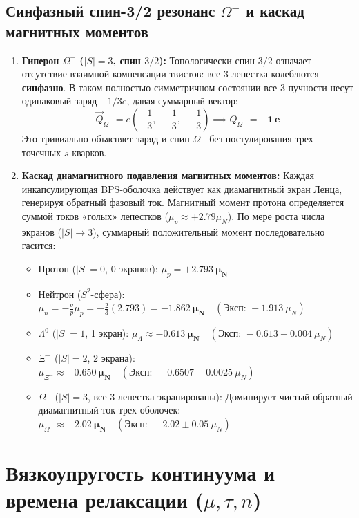 \documentclass[12pt,a4paper]{article}
\begin{document}
\subsection{Синфазный спин-3/2 резонанс $\Omega^-$ и каскад магнитных моментов}
\begin{enumerate}
	\item \textbf{Гиперон $\Omega^-$ ($|S|=3$, спин $3/2$):}
	Топологически спин $3/2$ означает отсутствие взаимной компенсации твистов: все 3 лепестка колеблются \textbf{синфазно}. 
	В таком полностью симметричном состоянии все 3 пучности несут одинаковый заряд $-1/3 e$, давая суммарный вектор:
	\begin{equation}
		\vec{Q}_{\Omega^-} = e \left(-\frac{1}{3}, \ -\frac{1}{3}, \ -\frac{1}{3}\right) \implies Q_{\Omega^-} = \mathbf{-1 \, e}
	\end{equation}
	Это тривиально объясняет заряд и спин $\Omega^-$ без постулирования трех точечных $s$-кварков.
	
	\item \textbf{Каскад диамагнитного подавления магнитных моментов:}
	Каждая инкапсулирующая BPS-оболочка действует как диамагнитный экран Ленца, генерируя обратный фазовый ток. Магнитный момент протона определяется суммой токов «голых» лепестков ($\mu_p \approx +2.79 \mu_N$). По мере роста числа экранов ($|S| \to 3$), суммарный положительный момент последовательно гасится:
	\begin{itemize}
		\item Протон ($|S|=0$, 0 экранов): $\mu_p = \mathbf{+2.793 \ \mu_N}$
		\item Нейтрон ($S^2$-сфера): $\mu_n = -\frac{q}{p} \mu_p = -\frac{2}{3}(2.793) = \mathbf{-1.862 \ \mu_N} \quad (\text{Эксп: } -1.913 \ \mu_N)$
		\item $\Lambda^0$ ($|S|=1$, 1 экран): $\mu_{\Lambda} \approx \mathbf{-0.613 \ \mu_N} \quad (\text{Эксп: } -0.613 \pm 0.004 \ \mu_N)$
		\item $\Xi^-$ ($|S|=2$, 2 экрана): $\mu_{\Xi^-} \approx \mathbf{-0.650 \ \mu_N} \quad (\text{Эксп: } -0.6507 \pm 0.0025 \ \mu_N)$
		\item $\Omega^-$ ($|S|=3$, все 3 лепестка экранированы): Доминирует чистый обратный диамагнитный ток трех оболочек: $\mu_{\Omega^-} \approx \mathbf{-2.02 \ \mu_N} \quad (\text{Эксп: } -2.02 \pm 0.05 \ \mu_N)$
	\end{itemize}
\end{enumerate}

\section{Вязкоупругость континуума и времена релаксации ($\mu, \tau, n$)}
\end{document}
